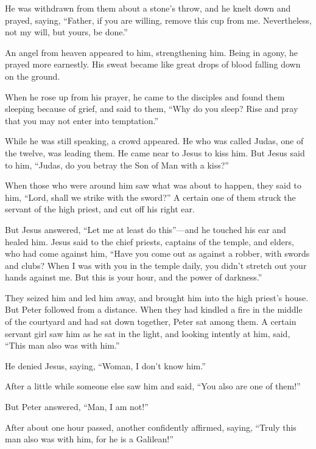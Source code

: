  He was withdrawn from them about a stone's throw, and he
knelt down and prayed,  saying, ``Father, if you are
willing, remove this cup from me. Nevertheless, not my will, but yours,
be done.''

 An angel from heaven appeared to him, strengthening him.
 Being in agony, he prayed more earnestly. His sweat became
like great drops of blood falling down on the ground.

 When he rose up from his prayer, he came to the disciples
and found them sleeping because of grief,  and said to
them, ``Why do you sleep? Rise and pray that you may not enter into
temptation.''

 While he was still speaking, a crowd appeared. He who was
called Judas, one of the twelve, was leading them. He came near to Jesus
to kiss him.  But Jesus said to him, ``Judas, do you betray
the Son of Man with a kiss?''

 When those who were around him saw what was about to
happen, they said to him, ``Lord, shall we strike with the sword?''
 A certain one of them struck the servant of the high
priest, and cut off his right ear.

 But Jesus answered, ``Let me at least do this''---and he
touched his ear and healed him.  Jesus said to the chief
priests, captains of the temple, and elders, who had come against him,
``Have you come out as against a robber, with swords and clubs?
 When I was with you in the temple daily, you didn't
stretch out your hands against me. But this is your hour, and the power
of darkness.''

 They seized him and led him away, and brought him into the
high priest's house. But Peter followed from a distance. 
When they had kindled a fire in the middle of the courtyard and had sat
down together, Peter sat among them.  A certain servant
girl saw him as he sat in the light, and looking intently at him, said,
``This man also was with him.''

 He denied Jesus, saying, ``Woman, I don't know him.''

 After a little while someone else saw him and said, ``You
also are one of them!''

But Peter answered, ``Man, I am not!''

 After about one hour passed, another confidently affirmed,
saying, ``Truly this man also was with him, for he is a Galilean!''

